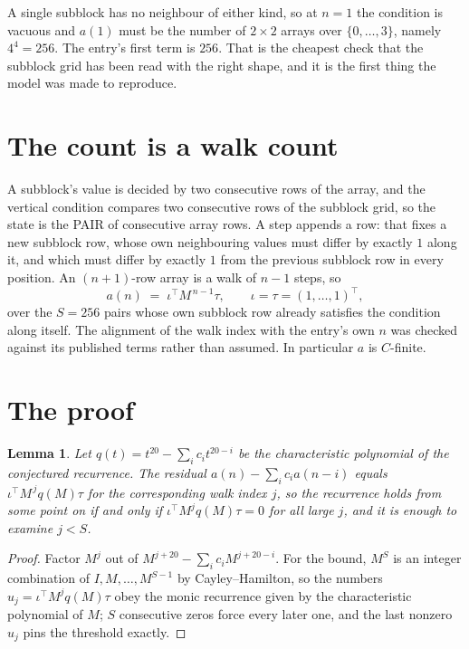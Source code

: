 \documentclass[11pt,a4paper]{article}
\theoremstyle{plain}
\newtheorem{lemma}[theorem]{Lemma}
\theoremstyle{definition}
\begin{document}
A single subblock has no neighbour of either kind, so at $n=1$ the condition is vacuous and
$a(1)$ must be the number of $2\times2$ arrays over $\{0,\dots,3\}$, namely
$4^{4}=256$. The entry's first term is $256$.
That is the cheapest check that the subblock grid has been read with the right shape, and it
is the first thing the model was made to reproduce.

\section{The count is a walk count}

A subblock's value is decided by two consecutive rows of the array, and the
vertical condition compares two consecutive rows of the subblock grid, so the state is the
PAIR of consecutive array rows. A step appends a row: that fixes a new subblock row, whose own
neighbouring values must differ by exactly $1$ along it, and which must differ by exactly
$1$ from the previous subblock row in every position. An $(n+1)$-row array is a walk of
$n-1$ steps, so
\[
a(n)\;=\;\iota^{\!\top}M^{\,n-1}\tau,\qquad\iota=\tau=(1,\dots,1)^{\!\top},
\]
over the $S=256$ pairs whose own subblock row already satisfies the condition along itself.
The alignment of the walk index with the entry's own $n$ was checked against its published
terms rather than assumed. In particular $a$ is $C$-finite.

\section{The proof}

\begin{lemma}\label{lem:crit}
Let $q(t)=t^{20}-\sum_i c_it^{20-i}$ be the characteristic polynomial of the
conjectured recurrence. The residual $a(n)-\sum_ic_ia(n-i)$ equals
$\iota^{\!\top}M^{\,j}q(M)\tau$ for the corresponding walk index $j$, so the recurrence
holds from some point on if and only if $\iota^{\!\top}M^{j}q(M)\tau=0$ for all large $j$,
and it is enough to examine $j<S$.
\end{lemma}

\begin{proof}
Factor $M^{j}$ out of $M^{j+20}-\sum_ic_iM^{j+20-i}$. For the bound, $M^{S}$
is an integer combination of $I,M,\dots,M^{S-1}$ by Cayley--Hamilton, so the numbers
$u_j=\iota^{\!\top}M^{j}q(M)\tau$ obey the monic recurrence given by the characteristic
polynomial of $M$; $S$ consecutive zeros force every later one, and the last nonzero $u_j$
pins the threshold exactly.
\end{proof}
\end{document}
